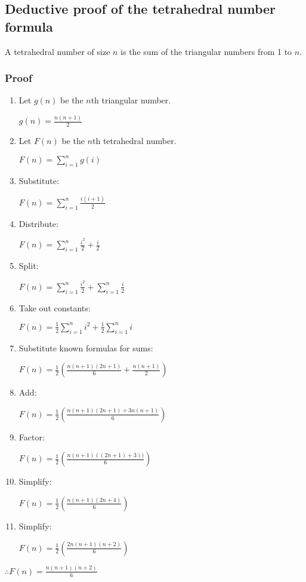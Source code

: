 \documentclass{article}
\begin{document}
\subsection*{Deductive proof of the tetrahedral number formula}
A tetrahedral number of size $n$ is the sum of the triangular numbers from 1 to $n$.
\subsubsection*{Proof}



\begin{enumerate}
	\item Let $g(n)$ be the $n$th triangular number.

		$g(n) = \frac{n(n+1)}{2}$
	\item Let $F(n)$ be the $n$th tetrahedral number.
	
		$F(n) = \sum\limits_{i=1}^n g(i)$
	\item Substitute:
		
		$F(n) = \sum\limits_{i=1}^n \frac{i(i+1)}{2}$
	\item Distribute:
	
		$F(n) = \sum\limits_{i=1}^n \frac{i^2}{2} + \frac{i}{2}$
	\item Split:
	
		$F(n) = \sum\limits_{i=1}^n \frac{i^2}{2} + \sum\limits_{i=1}^n \frac{i}{2}$
	\item Take out constants:
	
		$F(n) = \frac{1}{2} \sum\limits_{i=1}^n i^2 + \frac{1}{2} \sum\limits_{i=1}^n i$
	\item Substitute known formulas for sums:
	
		$F(n) = \frac{1}{2} \left( \frac{n(n+1)(2n+1)}{6} + \frac{n(n+1)}{2} \right) $
	\item Add:
	
		$F(n) = \frac{1}{2} \left( \frac{n(n+1)(2n+1) + 3n(n+1)}{6} \right) $
	\item Factor:
	
		$F(n) = \frac{1}{2} \left( \frac{n(n+1) ((2n+1) + 3))}{6} \right) $
	\item Simplify:
	
		$F(n) = \frac{1}{2} \left( \frac{n(n+1) (2n+4 )}{6} \right) $
	\item Simplify:
	
		$F(n) = \frac{1}{2} \left( \frac{2n(n+1) (n+2 )}{6} \right) $

\end{enumerate}

\begin{center}$\therefore F(n) = \frac{n(n+1)(n+2)}{6}$ \end{center}
\end{document}
